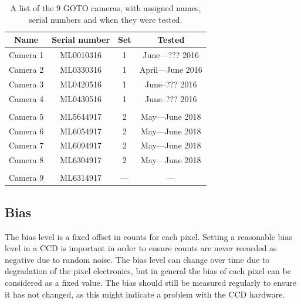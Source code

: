 \begin{colsection}
\begin{colsection}
\begin{table}[t]
    \begin{center}
        \begin{tabular}{cccc} %
            Name     & Serial number & Set & Tested     \\
            \midrule
            Camera 1 & ML0010316     & 1   & June---??? 2016 \\
            Camera 2 & ML0330316     & 1   & April---June 2016 \\
            Camera 3 & ML0420516     & 1   & June--??? 2016 \\
            Camera 4 & ML0430516     & 1   & June--??? 2016 \\
            \\
            Camera 5 & ML5644917     & 2   & May---June 2018 \\
            Camera 6 & ML6054917     & 2   & May---June 2018 \\
            Camera 7 & ML6094917     & 2   & May---June 2018 \\
            Camera 8 & ML6304917     & 2   & May---June 2018 \\
            \\
            Camera 9 & ML6314917     & --- & --- \\
        \end{tabular}
    \end{center}
    \caption[List of GOTO cameras]{
        A list of the 9 GOTO cameras, with assigned names, serial numbers and when they were tested.
        }\label{tab:cameras}
\end{table}

\end{colsection}

\newpage
\subsection{Bias}
\label{sec:bias}
\begin{colsection}

The bias level is a fixed offset in counts for each pixel. Setting a reasonable bias level in a CCD is important in order to ensure counts are never recorded as negative due to random noise. The bias level can change over time due to degradation of the pixel electronics, but in general the bias of each pixel can be considered as a fixed value. The bias should still be measured regularly to ensure it has not changed, as this might indicate a problem with the CCD hardware.


\end{colsection}
\end{colsection}
